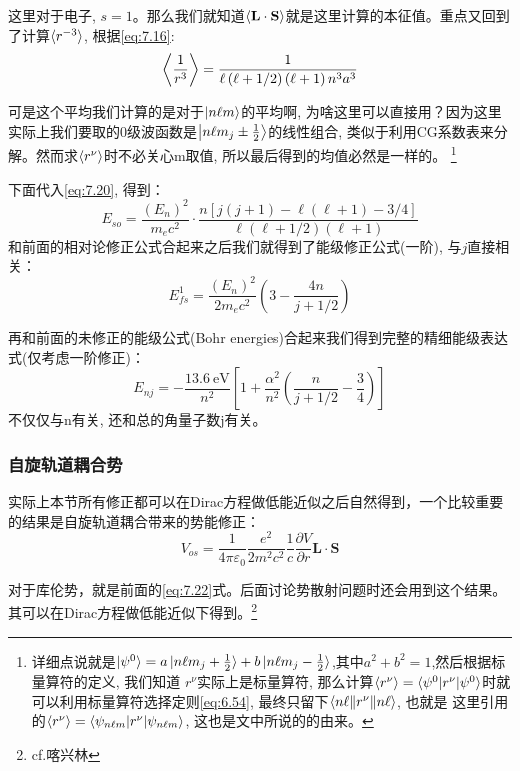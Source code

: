 \documentclass[a4paper,zihao=-4,linespread=1]{ctexrep}
\begin{document}
    这里对于电子, $s=1$。那么我们就知道$\braket{\mathbf{L}\cdot\mathbf{S}}$就是这里计算的本征值。重点又回到了计算$\braket{r^{-3}}$, 根据\ref{eq:7.16}:
    \[\Braket{\frac{1}{r^3}}=\frac{1}{\ell\left(\ell+1/2\right)\left(\ell+1\right)n^3a^3}\]
    
    可是这个平均我们计算的是对于$\ket{n\ell m}$的平均啊, 为啥这里可以直接用？因为这里实际上我们要取的0级波函数是$\Ket{n\ell m_j\pm\frac{1}{2}}$的线性组合,
    类似于利用CG系数表来分解。然而求$\braket{r^\nu}$时不必关心m取值, 所以最后得到的均值必然是一样的。
    \footnote{详细点说就是$\ket{\psi^0}=a\ket{n\ell m_j+\frac{1}{2}}+b\ket{n\ell m_j-\frac{1}{2}}$,其中$a^2+b^2=1$,然后根据标量算符的定义, 我们知道
    $r^\nu$实际上是标量算符, 那么计算$\braket{r^\nu}=\braket{\psi^0|r^\nu|\psi^0}$时就可以利用标量算符选择定则\ref{eq:6.54}, 最终只留下$\braket{n\ell\|r^\nu\|n\ell}$, 也就是
    这里引用的$\braket{r^\nu}=\braket{\psi_{n\ell m}|r^\nu|\psi_{n\ell m}}$, 这也是文中所说的的由来。}

    下面代入\ref{eq:7.20}, 得到：
    \[E_{so}=\frac{(E_n)^2}{m_ec^2}\cdot\frac{n\left[j\left(j+1\right)-\ell\left(\ell+1\right)-3/4\right]}{\ell(\ell+1/2)(\ell+1)}\]
    和前面的相对论修正公式合起来之后我们就得到了能级修正公式(一阶), 与$j$直接相关：
    \begin{equation}
        E^1_{fs}=\frac{(E_n)^2}{2m_ec^2}\left(3-\frac{4n}{j+1/2}\right)
    \end{equation}
    
    再和前面的未修正的能级公式(Bohr energies)合起来我们得到完整的精细能级表达式(仅考虑一阶修正)：
    \begin{equation}
        \label{eq:7.23}
        \boxed{E_{nj}=-\frac{\SI{13.6}{\electronvolt}}{n^2}\left[1+\frac{\alpha^2}{n^2}\left(\frac{n}{j+1/2}-\frac{3}{4}\right)\right]}
    \end{equation}
    不仅仅与n有关, 还和总的角量子数j有关。
    \subsubsection{自旋轨道耦合势}
  	实际上本节所有修正都可以在Dirac方程做低能近似之后自然得到，一个比较重要的结果是自旋轨道耦合带来的势能修正：
  	\begin{equation}
  		\label{eq:7.24}
  		V_{os}=\frac{1}{4\pi\varepsilon_0}\frac{e^2}{2m^2c^2}\frac{1}{c}\frac{\partial V}{\partial r}\mathbf{L}\cdot\mathbf{S}
  	\end{equation}
  	
  	对于库伦势，就是前面的\ref{eq:7.22}式。后面讨论势散射问题时还会用到这个结果。其可以在Dirac方程做低能近似下得到。\footnote{cf.喀兴林}
    
\end{document}
